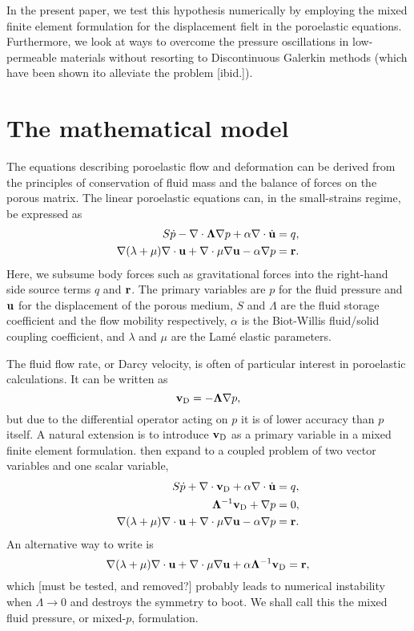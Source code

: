 In the present paper, we test this hypothesis numerically by employing the
mixed finite element formulation for the displacement fielt in the poroelastic
equations.
Furthermore, we look at ways to overcome the pressure oscillations in
low-permeable materials without resorting to Discontinuous Galerkin methods
(which have been shown ito alleviate the problem [ibid.]).

\section{The mathematical model}

The equations describing poroelastic flow and deformation can be derived from
the principles of conservation of fluid mass and the balance of forces on the
porous matrix.
%
The linear poroelastic equations can, in the small-strains regime, be
expressed as
%
\begin{align}
\label{eq:sim1}
S\dot{p} - \nabla \cdot \Lambda \nabla p + \alpha \nabla \cdot \dot{\U} &= q, \\
\label{eq:sim2}
\nabla (\lambda+\mu) \nabla \cdot \U + \nabla \cdot \mu \nabla \U
 -  \alpha \nabla p &= \V{r}.
\end{align}
%
Here, we subsume body forces such as gravitational forces into the right-hand
side source terms $q$ and $\mathbf{r}$.
The primary variables are $p$ for the fluid pressure and $\mathbf{u}$ for the
displacement of the porous medium, $S$ and $\Lambda$ are the fluid storage
coefficient and the flow mobility respectively, $\alpha$ is the Biot-Willis fluid/solid
coupling coefficient, and $\lambda$ and $\mu$ are the Lam\'e elastic parameters.

The fluid flow rate, or Darcy velocity, is often of particular interest in
poroelastic calculations.
It can be written as
\begin{equation}
  \vD= -\Lambda \nabla p,
\end{equation}
but due to the differential operator acting on $p$ it is of lower accuracy than
$p$ itself.
A natural extension is to introduce $\mathbf{v}_{\text{D}}$ as a primary variable in a mixed
finite element formulation.
 then expand to a coupled problem of two vector variables and one scalar
variable,
\begin{align}
\label{eq:simp1}
S\dot{p} + \nabla \cdot \vD + \alpha \nabla \cdot \dot{\U} &= q, \\
\label{eq:simp2}
  \Lambda^{-1} \vD + \nabla p &= 0,\\
\label{eq:simp3}
\nabla (\lambda+\mu) \nabla \cdot \U + \nabla \cdot \mu \nabla \U
 -  \alpha \nabla p &= \V{r}.
\end{align}
An alternative way to write  is
\begin{equation}
\nabla (\lambda+\mu) \nabla \cdot \U + \nabla \cdot \mu \nabla \U
 +  \alpha \Lambda^{-1}\vD = \V{r},
\end{equation}
which [must be tested, and removed?] probably leads to numerical instability
when $\Lambda\rightarrow 0$ and destroys the symmetry to boot.
We shall call this the mixed fluid pressure, or mixed-$p$, formulation.

